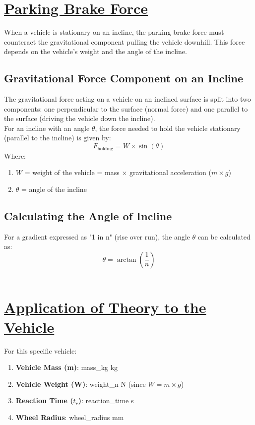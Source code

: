 \documentclass[14pt]{article}
\begin{document}
\section{\underline{Parking Brake Force}}

When a vehicle is stationary on an incline, the parking brake force must counteract the gravitational component pulling the vehicle downhill. This force depends on the vehicle's weight and the angle of the incline.
\\
\subsection{Gravitational Force Component on an Incline}
The gravitational force acting on a vehicle on an inclined surface is split into two components: one perpendicular to the surface (normal force) and one parallel to the surface (driving the vehicle down the incline).\\


For an incline with an angle $\theta$, the force needed to hold the vehicle stationary (parallel to the incline) is given by:
\[
F_{\text{holding}} = W \times \sin(\theta)
\]
Where:
\begin{enumerate}
    \item $W$ = weight of the vehicle = mass $\times$ gravitational acceleration ($m \times g$)
    \item $\theta$ = angle of the incline
\end{enumerate}
\subsection{Calculating the Angle of Incline}
For a gradient expressed as "1 in n" (rise over run), the angle $\theta$ can be calculated as:
\[
\theta = \arctan\left(\frac{1}{n}\right)
\]\\
\section{\underline{Application of Theory to the Vehicle}}
For this specific vehicle:
\begin{enumerate}
    \item \textbf{Vehicle Mass (m)}: {{mass_kg}} kg
    \item \textbf{Vehicle Weight (W)}: {{weight_n}} N (since $W = m \times g$)
    \item \textbf{Reaction Time ($t_r$)}: {{ reaction_time }} s
    \item \textbf{Wheel Radius}: {{wheel_radius}} mm
\end{enumerate}
\newpage
\end{document}
